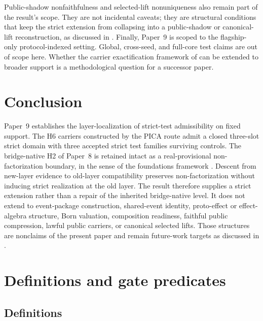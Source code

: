\documentclass[11pt]{article}
\newcommand{\OldLayer}{H2}
\newcommand{\NewLayer}{H6}
\newcommand{\PaperNine}{Paper~9}
\newcommand{\PaperEight}{Paper~8}
\theoremstyle{definition}
\begin{document}
Public-shadow nonfaithfulness and selected-lift nonuniqueness also remain part
of the result's scope.  They are not incidental caveats; they are structural
conditions that keep the strict extension from collapsing into a public-shadow
or canonical-lift reconstruction, as discussed in
.
Finally, \PaperNine{} is scoped to the flagship-only protocol-indexed setting.
Global, cross-seed, and full-core test claims are out of scope here.  Whether
the carrier exactification framework of \cite{Tsiokos2026CarrierExactification}
can be extended to broader support is a methodological question for a successor
paper.
 \section{Conclusion}\label{sec:conclusion}

\PaperNine{} establishes the layer-localization of strict-test admissibility on
fixed support.  The \NewLayer{} carriers constructed by the PICA route admit a
closed three-slot strict domain with three accepted strict test families
surviving controls.  The bridge-native \OldLayer{} of \PaperEight{}
\cite{Tsiokos2026CarrierToEvent} is retained intact as a real-provisional
non-factorization boundary, in the sense of the foundations framework
\cite{Tsiokos2026FoundationsII}.  Descent from new-layer evidence to old-layer
compatibility preserves non-factorization without inducing strict realization
at the old layer.  The result therefore supplies a strict extension rather than
a repair of the inherited bridge-native level.  It does not extend to
event-package construction, shared-event identity, proto-effect or
effect-algebra structure, Born valuation, composition readiness, faithful
public compression, lawful public carriers, or canonical selected lifts.  Those
structures are nonclaims of the present paper and remain future-work targets as
discussed in .
 
\appendix
\section{Definitions and gate predicates}\label{app:definitions}

\subsection{Definitions}\label{subsec:definitions-list}
\end{document}
